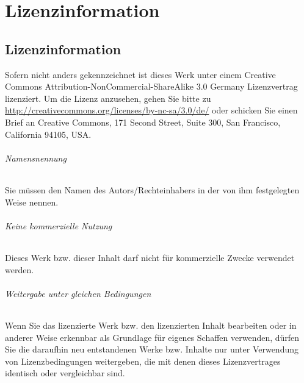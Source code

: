 \part {Lizenzinformation}
\chapter {Lizenzinformation}
\label{chapt:Lizenzinformation}
Sofern nicht anders gekennzeichnet ist dieses Werk unter einem Creative Commons Attribution-NonCommercial-ShareAlike 3.0 Germany Lizenzvertrag lizenziert. Um die Lizenz anzusehen, gehen Sie bitte zu \url{http://creativecommons.org/licenses/by-nc-sa/3.0/de/} oder schicken Sie einen Brief an Creative Commons, 171 Second Street, Suite 300, San Francisco, California 94105, USA.
\\
\paragraph*{Namensnennung}
Sie müssen den Namen des Autors/Rechteinhabers in der von ihm festgelegten Weise nennen.

\paragraph*{Keine kommerzielle Nutzung}
Dieses Werk bzw. dieser Inhalt darf nicht für kommerzielle Zwecke verwendet werden.

\paragraph*{Weitergabe unter gleichen Bedingungen}
Wenn Sie das lizenzierte Werk bzw. den lizenzierten Inhalt bearbeiten oder in anderer Weise erkennbar als Grundlage für eigenes Schaffen verwenden, dürfen Sie die daraufhin neu entstandenen Werke bzw. Inhalte nur unter Verwendung von Lizenzbedingungen weitergeben, die mit denen dieses Lizenzvertrages identisch oder vergleichbar sind. 
